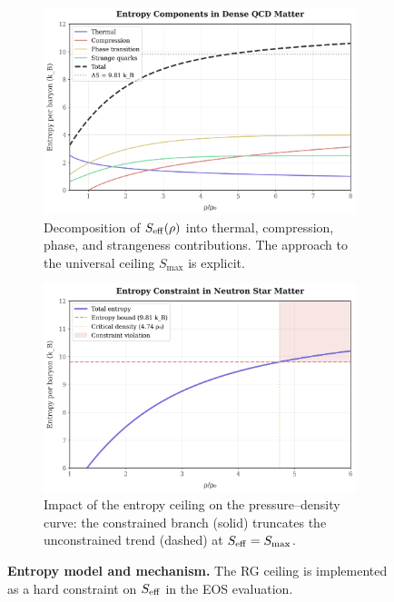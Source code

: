 \documentclass[11pt]{article}
\begin{document}
\begin{figure}[h!]
  \centering
  \begin{subfigure}[t]{0.48\textwidth}
    \includegraphics[width=\textwidth]{entropy_components.png}
    \caption{Decomposition of $S_{\rm eff}(\rho)$ into thermal, compression, phase, and strangeness contributions. The approach to the universal ceiling $S_{\max}$ is explicit.}
    \label{fig:entropy-components}
  \end{subfigure}\hfill
  \begin{subfigure}[t]{0.48\textwidth}
    \includegraphics[width=\textwidth]{entropy_constraint_effect.png}
    \caption{Impact of the entropy ceiling on the pressure–density curve: the constrained branch (solid) truncates the unconstrained trend (dashed) at $S_{\rm eff}=S_{\max}$.}
    \label{fig:entropy-constraint}
  \end{subfigure}
  \caption{\textbf{Entropy model and mechanism.} The RG ceiling is implemented as a hard constraint on $S_{\rm eff}$ in the EOS evaluation.}
  \label{fig:entropy-model}
\end{figure}
\end{document}
